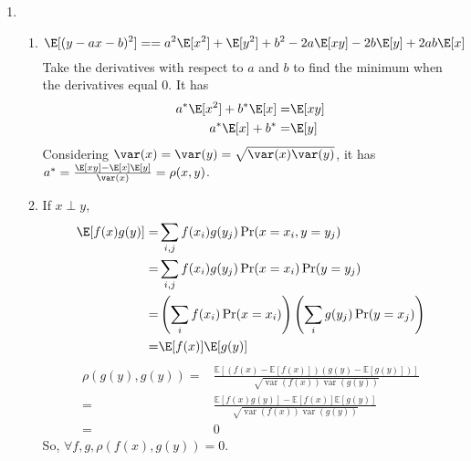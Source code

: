 \documentclass[a4paper]{article}
\begin{document}
\begin{enumerate}
\begin{enumerate}
    \end{enumerate}
  \item
  \begin{enumerate}
      \item 
      \begin{equation*}
      \E[(y-ax-b)^2]==a^2\E[x^2]+\E[y^2]+b^2-2a\E[xy]-2b\E[y]+2ab\E[x]
      \end{equation*}
      Take the derivatives with respect to $a$ and $b$ to find the minimum when the derivatives equal 0. It has
      \begin{equation*}
          \begin{align*}
              a^{*}\E[x^2]+b^{*}\E[x]=&\E[xy]\\
              a^{*}\E[x]+b^{*}=&\E[y]\\
          \end{align*}
      \end{equation*}
      Considering $\var(x)=\var(y)=\sqrt{\var(x)\var(y)}$, it has $a^{*}=\frac{\E[xy]-\E[x]\E[y]}{\var(x)}=\rho(x,y)$.
      \item
      If $x \perp y$, 
      \begin{equation*}
          \begin{align*}
          \E[f(x)g(y)]=&\sum_{i,j}f(x_i)g(y_j)\Pr(x=x_i,y=y_j)\\
          =&\sum_{i,j}f(x_i)g(y_j)\Pr(x=x_i)\Pr(y=y_j)\\
          =&\left(\sum_{i}f(x_i)\Pr(x=x_i)\right)\left(\sum_{i}g(y_j)\Pr(y=x_j)\right)\\
          =&\E[f(x)]\E[g(y)]
          \end{align*}
      \end{equation*}
      \begin{equation*}
          \begin{align*}
          \rho(g(y), g(y))=&\frac{\mathbb{E}[(f(x)-\mathbb{E}[f(x)])(g(y)-\mathbb{E}[g(y)])]}{\sqrt{\operatorname{var}(f(x)) \operatorname{var}(g(y))}}\\
          =&\frac{\mathbb{E}[f(x)g(y)] - \mathbb{E}[f(x)] \mathbb{E}[g(y)]}{\sqrt{\operatorname{var}(f(x)) \operatorname{var}(g(y))}}\\
          =&0
          \end{align*}
      \end{equation*}
      So, $\forall f,g,\rho(f(x),g(y))=0$.
      

\end{enumerate}
\end{enumerate}
\end{document}

